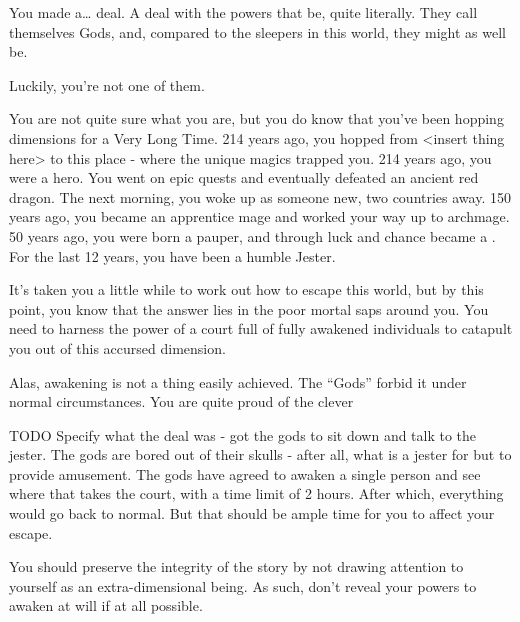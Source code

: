 \documentclass[char]{Emperia}
\begin{document}
\name{\cJester{}}

You made a\ldots{} deal. A deal with the powers that be, quite literally. They call themselves Gods, and, compared to the sleepers in this world, they might as well be. 

Luckily, you're not one of them.

You are not quite sure what you are, but you do know that you've been hopping dimensions for a Very Long Time. 214 years ago, you hopped from <insert thing here> to this place - where the unique magics trapped you. 214 years ago, you were a hero. You went on epic quests and eventually defeated an ancient red dragon. The next morning, you woke up as someone new, two countries away. 150 years ago, you became an apprentice mage and worked your way up to archmage. 50 years ago, you were born a pauper, and through luck and chance became a \monarch{}. For the last 12 years, you have been a humble Jester. 

It's taken you a little while to work out how to escape this world, but by this point, you know that the answer lies in the poor mortal saps around you. You need to harness the power of a court full of fully awakened individuals to catapult you out of this accursed dimension. 

Alas, awakening is not a thing easily achieved. The ``Gods'' forbid it under normal circumstances. You are quite proud of the clever 



TODO
Specify what the deal was - got the gods to sit down and talk to the jester. The gods are bored out of their skulls - after all, what is a jester for but to provide amusement. The gods have agreed to awaken a single person and see where that takes the court, with a time limit of 2 hours. After which, everything would go back to normal. But that should be ample time for you to affect your escape.


You should preserve the integrity of the story by not drawing attention to yourself as an extra-dimensional being. As such, don't reveal your powers to awaken at will if at all possible.
\end{document}
